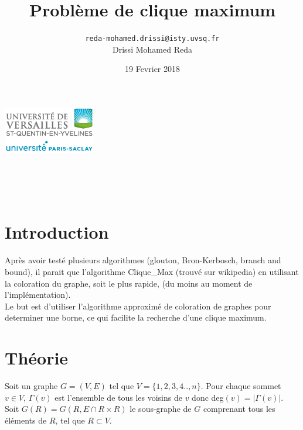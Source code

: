 \documentclass{article}
\title{\Huge Problème de clique maximum}
\author{\texttt{reda-mohamed.drissi@isty.uvsq.fr}\\
        Drissi Mohamed Reda}
\date{19 Fevrier 2018}
\begin{document}
\makeatletter
    \begin{titlepage}
        \begin{center}
        	\includegraphics[width=40mm]{Report/uvsq-header.png}\par \vspace{1cm}
            {\@title }\\[4ex]
            {\@author}\\[4ex]
            {\@date} \\ [4ex]
        \end{center}
    \end{titlepage}
\makeatother
\thispagestyle{empty}
\newpage
\tableofcontents
\newpage
\section{Introduction}
Après avoir testé plusieurs algorithmes (glouton, Bron-Kerbosch, branch and bound), il parait que
l'algorithme Clique\_Max (trouvé sur wikipedia) en utilisant la coloration du graphe,
soit le plus rapide, (du moins au moment de l'implémentation).\\
Le but est d'utiliser l'algorithme approximé de coloration de graphes pour determiner une borne,
ce qui facilite la recherche d'une clique maximum.
\section{Théorie}
Soit un graphe $G=(V,E)$ tel que $V=\{1,2,3,4..,n\}$. Pour chaque sommet $v \in V$, $\Gamma(v)$
est l'ensemble de tous les voisins de $v$ donc deg$(v)=|\Gamma(v)|$.\\
Soit $G(R)=G(R,E\cap R\times R)$ le sous-graphe de $G$ comprenant tous les éléments de $R$, tel que
$R \subset V$.
\end{document}
